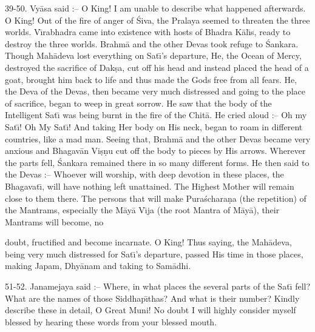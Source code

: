 39-50. Vy\=asa said :-- O King! I am unable to describe what happened afterwards. O King! Out of the fire of anger of \'Siva, the Pralaya seemed to threaten the three worlds. V\={\i}rabhadra came into existence with hosts of Bhadra K\=al\={\i}s, ready to destroy the three worlds. Brahm\=a and the other Devas took refuge to \'Sankara. Though Mah\=adeva lost everything on Sat\={\i}'s departure, He, the Ocean of Mercy, destroyed the sacrifice of Dak\d{s}a, cut off his head and instead placed the head of a goat, brought him back to life and thus made the Gods free from all fears. He, the Deva of the Devas, then became very much distressed and going to the place of sacrifice, began to weep in great sorrow. He saw that the body of the Intelligent Sat\={\i} was being burnt in the fire of the Chit\=a. He cried aloud :-- Oh my Sat\={\i}! Oh My Sat\={\i}! And taking Her body on His neck, began to roam in different countries, like a mad man. Seeing that, Brahm\=a and the other Devas became very anxious and Bhagav\=an Vi\d{s}\d{n}u cut off the body to pieces by His arrows. Wherever the parts fell, \'Sankara remained there in so many different forms. He then said to the Devas :-- Whoever will worship, with deep devotion in these places, the Bhagavat\={\i}, will have nothing left unattained. The Highest Mother will remain close to them there. The persons that will make Pura\'schara\d{n}a (the repetition) of the Mantrams, especially the M\=ay\=a V\={\i}ja (the root Mantra of M\=ay\=a), their Mantrams will become, no

doubt, fructified and become incarnate. O King! Thus saying, the Mah\=adeva, being very much distressed for Sat\={\i}'s departure, passed His time in those places, making Japam, Dhy\=anam and taking to Sam\=adhi.

51-52. Janamejaya said :-- Where, in what places the several parts of the Sat\={\i} fell? What are the names of those Siddhap\={\i}thas? And what is their number? Kindly describe these in detail, O Great Muni! No doubt I will highly consider myself blessed by hearing these words from your blessed mouth.

